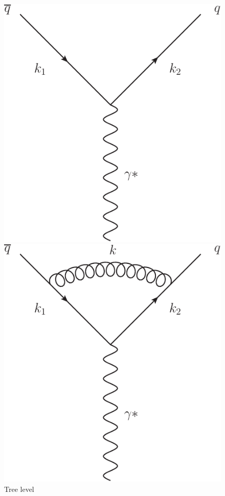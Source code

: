 	\begin{figure}[tpb]
		\centering
			\begin{minipage}{0.4\linewidth}
				\centering
				\includegraphics[width=0.98\linewidth]{TreeLevel}
				\caption{Tree level}
			\end{minipage}
			\begin{minipage}{0.4\linewidth}
				\centering
				\includegraphics[width=0.98\linewidth]{NLOVirtual}

\end{minipage}
\end{figure}
